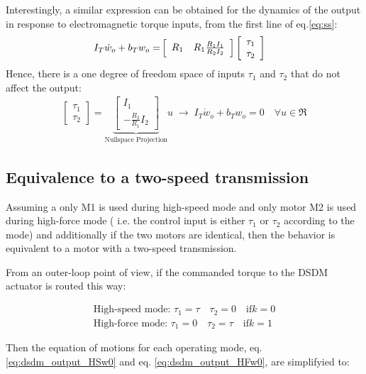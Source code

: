 Interestingly, a similar expression can be obtained for the dynamics of the output in response to electromagnetic torque inputs, from the first line of eq.\eqref{eq:ss}:
%
\begin{align}
I_T \dot{w}_o +
b_T  w_o
=&
\left[ \begin{array}{c c}
R_1 & R_1 \frac{R_1 I_1}{R_2 I_2}
\end{array} \right]
\left[ \begin{array}{c}
\tau_1 \\
\tau_2
\end{array} \right]
\label{eq:output}
\end{align}
% 
Hence, there is a one degree of freedom space of inputs $\tau_1$ and $\tau_2$ that do not affect the output:
\begin{align}
\left[ \begin{array}{c}
\tau_1 \\
\tau_2
\end{array} \right]
 = 
\underbrace{\left[ \begin{array}{c}
I_1 \\
-\frac{R_2 }{R_1 }  I_2
\end{array} \right]}_{\text{Nullspace Projection}} u
\; \rightarrow \;
I_T \dot{w}_o +
b_T  w_o = 0 \quad \forall u \in \Re
\label{eq:dyn_null_proj}
\end{align}


\subsection{Equivalence to a two-speed transmission}

Assuming a only M1 is used during high-speed mode and only motor M2 is used during high-force mode ( i.e. the control input is either $\tau_1$ or $\tau_2$ according to the mode) and additionally if the two motors are identical, then the behavior is equivalent to a motor with a two-speed transmission. 

From an outer-loop point of view, if the commanded torque to the DSDM actuator is routed this way:

\begin{align}
\text{High-speed mode: }\tau_1 = \tau \quad \tau_2 = 0    \quad \text{if} k=0 \\
\text{High-force mode: }\tau_1 = 0    \quad \tau_2 = \tau \quad \text{if} k=1
\end{align}

Then the equation of motions for each operating mode, eq. \eqref{eq:dsdm_output_HSw0} and eq. \eqref{eq:dsdm_output_HFw0},  are simplifyied to:

